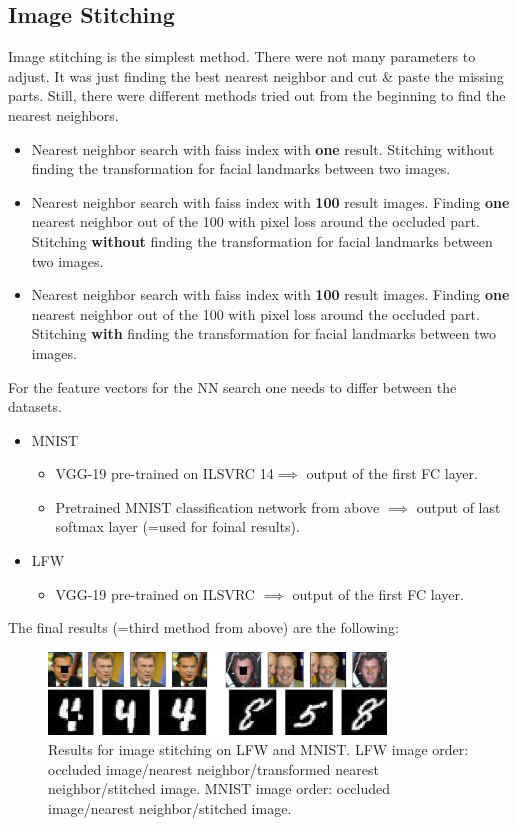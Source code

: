 \documentclass[
     11pt,         %
     a4paper,      %
     oneside,
     ]{article}
\begin{document}
\subsection{Image Stitching}
Image stitching is the simplest method. There were not many parameters to adjust. It was just finding the best nearest neighbor and cut \& paste the missing parts.
Still, there were different methods tried out from the beginning to find the nearest neighbors.
\begin{itemize}
  \item Nearest neighbor search with faiss index with \textbf{one} result. Stitching without finding the transformation for facial landmarks between two images.
  \item Nearest neighbor search with faiss index with \textbf{100} result images.
  Finding \textbf{one} nearest neighbor out of the 100 with pixel loss around the occluded part. Stitching \textbf{without} finding the transformation for facial landmarks between two images.
  \item Nearest neighbor search with faiss index with \textbf{100} result images.
  Finding \textbf{one} nearest neighbor out of the 100 with pixel loss around the occluded part. Stitching \textbf{with} finding the transformation for facial landmarks between two images.
\end{itemize}
For the feature vectors for the NN search one needs to differ between the datasets.
\begin{itemize}
  \item MNIST
  \begin{itemize}
    \item VGG-19 pre-trained on ILSVRC 14$\implies$ output of the first FC layer.
    \item Pretrained MNIST classification network from above $\implies$ output of last softmax layer (=used for foinal results).
  \end{itemize}
  \item LFW
  \begin{itemize}
    \item VGG-19 pre-trained on ILSVRC $\implies$ output of the first FC layer.
  \end{itemize}
\end{itemize}
The final results (=third method from above) are the following:
  \begin{figure}[H]
    \begin{center}
      \includegraphics[width=0.8\textwidth]{images/stitching_final2.png}
      \caption{Results for image stitching on LFW and MNIST. LFW image order: occluded image/nearest neighbor/transformed nearest neighbor/stitched image. MNIST image order: occluded image/nearest neighbor/stitched image.}
    \end{center}
  \end{figure}
\end{document}
